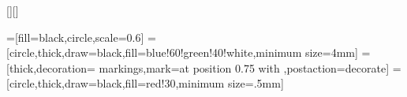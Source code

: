 \usepackage{amsmath}
\usepackage{amssymb}
\usepackage{cancel}
\usepackage{amsthm}
\usepackage{mathrsfs}
\usepackage[dvipsnames]{xcolor}
\usepackage{graphicx}
\usepackage{epigraph}
\usepackage{booktabs}
\usepackage{relsize}
\usepackage{hyperref}
\usepackage{multicol}
  \setlength{\columnsep}{3cm}
\usepackage{floatrow}
	[][\FBwidth]
\usepackage{kbordermatrix}
\usepackage{transparent}
\usepackage[normalem]{ulem}
\hypersetup{colorlinks} 
\hypersetup{ %
    colorlinks=true,    
    linkcolor =RubineRed,
    citecolor=RubineRed
}

\usepackage{array}

\usepackage[shortlabels]{enumitem}

\usepackage{tikz}
\usetikzlibrary{cd,calc, arrows, shapes, matrix, positioning, intersections, decorations.markings, arrows.meta, decorations.pathmorphing}
	=[fill=black,circle,scale=0.6]
  =[circle,thick,draw=black,fill=blue!60!green!40!white,minimum size=4mm]
   = [thick,decoration={
      markings,mark=at position 0.75 with {\arrow[scale=1.5,>=stealth]{>}}},postaction={decorate}]
  =[circle,thick,draw=black,fill=red!30,minimum size=.5mm] 


\newcommand{\ar}[1]{\xrightarrow{\ensuremath{#1}}}


\newcommand{\V}{\mathcal{V}}
\newcommand{\D}{\mathsf{D}}
\newcommand{\E}{\mathsf{E}}
\renewcommand{\o}{{\color{YellowOrange}o}}
\newcommand{\g}{{\color{Green}g}}
\newcommand{\p}{{\color{Purple}p}}
\newcommand{\<}{\langle}
\renewcommand{\>}{\rangle}
\newenvironment{bsmallmatrix}
  {\left[\begin{smallmatrix}}
  {\end{smallmatrix}\right]}
\let\emph\relax %
\DeclareTextFontCommand{\emph}{\bfseries}




\newcommand{\End}{\operatorname{End}}
\newcommand{\op}{\operatorname{op}}
\newcommand{\tr}{\operatorname{tr}}
\DeclareMathOperator{\id}{id}
\DeclareMathOperator{\eval}{eval}

